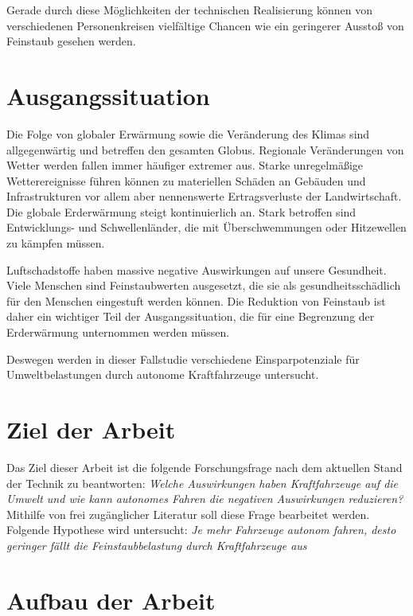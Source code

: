 Gerade durch diese Möglichkeiten der technischen Realisierung können von verschiedenen Personenkreisen
vielfältige Chancen wie ein geringerer Ausstoß von Feinstaub gesehen werden.

\section{Ausgangssituation}
Die Folge von globaler Erwärmung sowie die Veränderung des Klimas sind allgegenwärtig und betreffen den gesamten Globus.
Regionale Veränderungen von Wetter werden fallen immer häufiger extremer aus.
Starke unregelmäßige Wetterereignisse führen können zu materiellen Schäden an Gebäuden und Infrastrukturen vor allem aber nennenswerte Ertragsverluste der Landwirtschaft.
Die globale Erderwärmung steigt kontinuierlich an.
Stark betroffen sind Entwicklungs- und Schwellenländer, die mit Überschwemmungen oder Hitzewellen zu kämpfen müssen.


Luftschadstoffe haben massive negative Auswirkungen auf unsere Gesundheit.
Viele Menschen sind Feinstaubwerten ausgesetzt, die sie als gesundheitsschädlich für den Menschen eingestuft werden können.
Die Reduktion von Feinstaub ist daher ein wichtiger Teil der Ausgangssituation, die für eine Begrenzung der Erderwärmung unternommen werden müssen.

Deswegen werden in dieser Fallstudie verschiedene Einsparpotenziale für Umweltbelastungen durch autonome Kraftfahrzeuge untersucht.


\section{Ziel der Arbeit}
Das Ziel dieser Arbeit ist die folgende Forschungsfrage nach dem aktuellen Stand der Technik zu beantworten:
\textit{Welche Auswirkungen haben Kraftfahrzeuge auf die Umwelt und wie kann autonomes Fahren die negativen Auswirkungen reduzieren?}
Mithilfe von frei zugänglicher Literatur soll diese Frage bearbeitet werden.
Folgende Hypothese wird untersucht:
\textit{Je mehr Fahrzeuge autonom fahren, desto geringer fällt die Feinstaubbelastung durch Kraftfahrzeuge aus}

\section{Aufbau der Arbeit}




